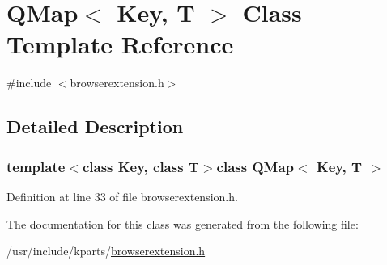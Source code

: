 \hypertarget{classQMap}{\section{Q\+Map$<$ Key, T $>$ Class Template Reference}
\label{classQMap}
}


{\ttfamily \#include $<$browserextension.\+h$>$}



\subsection{Detailed Description}
\subsubsection*{template$<$class Key, class T$>$class Q\+Map$<$ Key, T $>$}



Definition at line 33 of file browserextension.\+h.



The documentation for this class was generated from the following file\+:\begin{DoxyCompactItemize}
\item 
/usr/include/kparts/\hyperlink{browserextension_8h}{browserextension.\+h}\end{DoxyCompactItemize}
